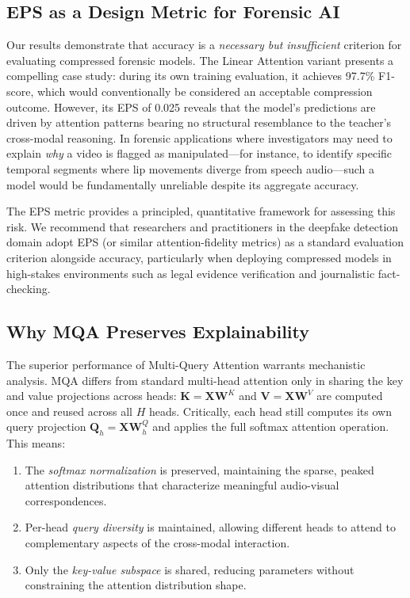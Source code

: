 \documentclass[lettersize,journal]{IEEEtran}
\begin{document}
\subsection{EPS as a Design Metric for Forensic AI}

Our results demonstrate that accuracy is a \emph{necessary but insufficient} criterion for evaluating compressed forensic models. The Linear Attention variant presents a compelling case study: during its own training evaluation, it achieves 97.7\% F1-score, which would conventionally be considered an acceptable compression outcome. However, its EPS of 0.025 reveals that the model's predictions are driven by attention patterns bearing no structural resemblance to the teacher's cross-modal reasoning. In forensic applications where investigators may need to explain \emph{why} a video is flagged as manipulated---for instance, to identify specific temporal segments where lip movements diverge from speech audio---such a model would be fundamentally unreliable despite its aggregate accuracy.

The EPS metric provides a principled, quantitative framework for assessing this risk. We recommend that researchers and practitioners in the deepfake detection domain adopt EPS (or similar attention-fidelity metrics) as a standard evaluation criterion alongside accuracy, particularly when deploying compressed models in high-stakes environments such as legal evidence verification and journalistic fact-checking.

\subsection{Why MQA Preserves Explainability}

The superior performance of Multi-Query Attention warrants mechanistic analysis. MQA differs from standard multi-head attention only in sharing the key and value projections across heads: $\mathbf{K} = \mathbf{X}\mathbf{W}^K$ and $\mathbf{V} = \mathbf{X}\mathbf{W}^V$ are computed once and reused across all $H$ heads. Critically, each head still computes its own query projection $\mathbf{Q}_h = \mathbf{X}\mathbf{W}^Q_h$ and applies the full softmax attention operation. This means:
\begin{enumerate}
    \item The \emph{softmax normalization} is preserved, maintaining the sparse, peaked attention distributions that characterize meaningful audio-visual correspondences.
    \item Per-head \emph{query diversity} is maintained, allowing different heads to attend to complementary aspects of the cross-modal interaction.
    \item Only the \emph{key-value subspace} is shared, reducing parameters without constraining the attention distribution shape.
\end{enumerate}
\end{document}
